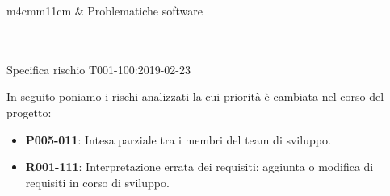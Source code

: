 	\mydoublerule{\linewidth}{0pt}{2pt}
    
    \begin{table}[H]
		\begin{risktable}{\columnwidth}{m{4cm}m{11cm}}
			 &
			Problematiche software \\

			\rowcolor{\tablegray}
			\\

			\\
		\end{risktable}
		\caption{Specifica rischio T001-100:2019-02-23}		
	\end{table}
    
    \mydoublerule{\linewidth}{0pt}{2pt}
	\vspace{1cm}

	In seguito poniamo i rischi analizzati la cui priorità è cambiata nel corso del progetto:
	\begin{itemize}
	    \item \textbf{P005-011}: Intesa parziale tra i membri del team di sviluppo.
	    \item \textbf{R001-111}: Interpretazione errata dei requisiti: aggiunta o modifica di requisiti in corso di sviluppo.
	\end{itemize}